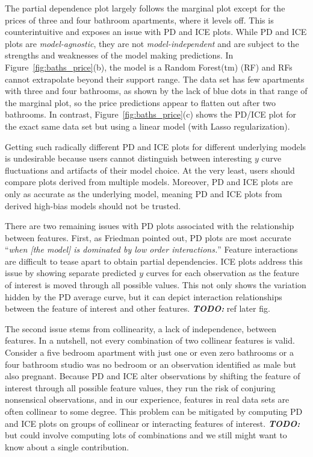 \documentclass[12pt]{article}
\newcommand{\figref}[1]{Figure~\ref{#1}}
\newcommand{\todo}[1]{{\bf\em TODO:} #1}
\begin{document}
The partial dependence plot largely follows the marginal plot except for the prices of three and four bathroom apartments, where it levels off. This is counterintuitive and exposes an issue with PD and ICE plots. While PD and ICE plots are {\em model-agnostic}, they are not {\em model-independent} and are subject to the strengths and weaknesses of the model making predictions. In \figref{fig:baths_price}(b), the model is a Random Forest(tm) (RF) and RFs cannot extrapolate beyond their support range.  The data set has few apartments with three and four bathrooms, as shown by the lack of blue dots in that range of the marginal plot, so the price predictions appear to flatten out after two bathrooms.  In contrast, \figref{fig:baths_price}(c) shows the PD/ICE plot for the exact same data set but using a linear model (with Lasso regularization).

Getting such radically different PD and ICE plots for different underlying models is undesirable because users cannot distinguish between interesting $y$ curve fluctuations and artifacts of their model choice. At the very least, users should compare plots derived from multiple models. Moreover, PD and ICE plots are only as accurate as the underlying model, meaning PD and ICE plots from derived high-bias models should not be trusted.

There are two remaining issues with PD plots associated with the relationship between features. First, as Friedman pointed out, PD plots are most accurate ``{\em when {\em [the model]} is dominated by low order interactions.}''  Feature interactions are difficult to tease apart to obtain partial dependencies. ICE plots address this issue by showing separate predicted $y$ curves for each observation as the feature of interest is moved through all possible values.  This not only shows the variation hidden by the PD average curve, but it can depict interaction relationships between the feature of interest and other features. \todo{ref later fig}.

The second issue stems from collinearity, a lack of independence, between features.  In a nutshell, not every combination of two collinear features is valid. Consider a five bedroom apartment with just one or even zero bathrooms or a four bathroom studio was no bedroom or an observation identified as male but also pregnant.  Because PD and ICE alter observations by shifting the feature of interest through all possible feature values, they run the risk of conjuring nonsensical observations, and in our experience, features in real data sets are often collinear to some degree. This problem can be mitigated by computing PD and ICE plots on groups of collinear or interacting features of interest. \todo{but could involve computing lots of combinations and we still might want to know about a single contribution.}
\end{document}
